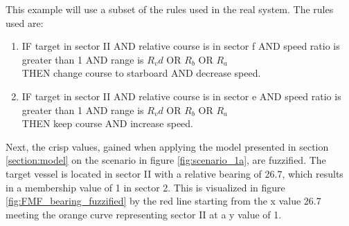 This example will use a subset of the rules used in the real system.
The rules used are:
\begin{enumerate}[label=\textbf{Rule \arabic*},ref=Rule \arabic*]
    \item \label{rule:1} IF target in sector II AND relative course is in sector f  AND speed ratio is greater than 1  AND range is $R_vd$ OR $R_b$ OR $R_a$ \\THEN change course to starboard  AND  decrease speed.
    \item IF target in sector II AND relative course is in sector e AND  speed ratio is greater than 1  AND  range is $R_vd$ OR $R_b$ OR $R_a$ \\THEN keep course   AND  increase speed.
\end{enumerate}

Next, the crisp values, gained when applying the model presented in section \ref{section:model} on the scenario in figure \ref{fig:scenario_1a}, are fuzzified. The target vessel is located in sector II with a relative bearing of 26.7\textdegree, which results in a membership value of 1 in sector 2. This is visualized in figure \ref{fig:FMF_bearing_fuzzified} by the red line starting from the x value 26.7 meeting the orange curve representing sector II at a y value of 1.

